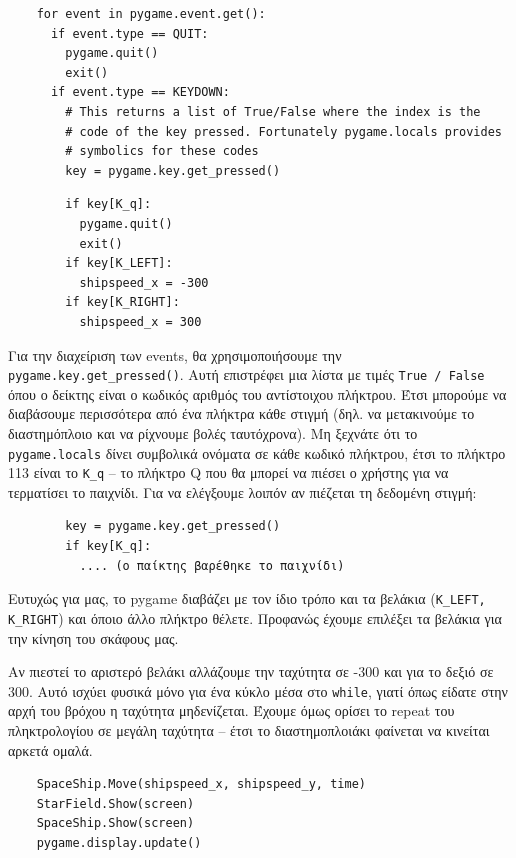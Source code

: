 \begin{verbatim}
    for event in pygame.event.get():
      if event.type == QUIT:
        pygame.quit()
        exit()
      if event.type == KEYDOWN:
        # This returns a list of True/False where the index is the
        # code of the key pressed. Fortunately pygame.locals provides
        # symbolics for these codes
        key = pygame.key.get_pressed()
\end{verbatim}

\begin{verbatim}
        if key[K_q]:
          pygame.quit()
          exit()
        if key[K_LEFT]:
          shipspeed_x = -300
        if key[K_RIGHT]:
          shipspeed_x = 300
\end{verbatim}

Για την διαχείριση των events, θα χρησιμοποιήσουμε την
{\tt pygame.key.get\_pressed()}. Αυτή επιστρέφει μια λίστα με τιμές {\tt True / False}
όπου ο δείκτης είναι ο κωδικός αριθμός του αντίστοιχου πλήκτρου. Έτσι
μπορούμε να διαβάσουμε περισσότερα από ένα πλήκτρα κάθε στιγμή (δηλ. να
μετακινούμε το διαστημόπλοιο και να ρίχνουμε βολές ταυτόχρονα). Μη ξεχνάτε
ότι το {\tt pygame.locals} δίνει συμβολικά ονόματα σε κάθε κωδικό πλήκτρου, έτσι
το πλήκτρο 113 είναι το {\tt K\_q} -- το πλήκτρο Q που θα μπορεί να πιέσει ο χρήστης για να τερματίσει το παιχνίδι. Για να ελέγξουμε λοιπόν αν πιέζεται τη δεδομένη στιγμή:

\begin{verbatim}
        key = pygame.key.get_pressed()
        if key[K_q]:
          .... (ο παίκτης βαρέθηκε το παιχνίδι)
\end{verbatim}

Ευτυχώς για μας, το pygame διαβάζει με τον ίδιο τρόπο και τα βελάκια
({\tt Κ\_LEFT, K\_RIGHT}) και όποιο άλλο πλήκτρο θέλετε. Προφανώς έχουμε επιλέξει τα βελάκια για την κίνηση του σκάφους μας.

Αν πιεστεί το αριστερό βελάκι αλλάζουμε την ταχύτητα σε -300 και για το δεξιό σε 300. Αυτό ισχύει φυσικά μόνο για ένα κύκλο μέσα στο {\tt while}, γιατί όπως είδατε στην αρχή του βρόχου η ταχύτητα μηδενίζεται. Έχουμε όμως ορίσει το repeat του πληκτρολογίου σε μεγάλη ταχύτητα -- έτσι το διαστημοπλοιάκι φαίνεται να κινείται αρκετά ομαλά.

\begin{verbatim}
    SpaceShip.Move(shipspeed_x, shipspeed_y, time)
    StarField.Show(screen)
    SpaceShip.Show(screen)
    pygame.display.update()
\end{verbatim}

